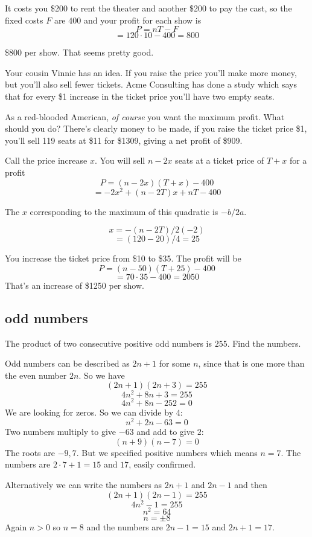\documentclass[11pt, oneside]{article}
\begin{document}
It costs you \$200 to rent the theater and another \$200 to pay the cast, so the fixed costs $F$ are $400$ and your profit for each show is
\[ P = nT - F \]
\[ = 120 \cdot 10 - 400 = 800 \]

\$800 per show.  That seems pretty good.

Your cousin Vinnie has an idea.  If you raise the price you'll make more money, but you'll also sell fewer tickets.  Acme Consulting has done a study which says that for every \$1 increase in the ticket price you'll have two empty seats.

As a red-blooded American, \emph{of course} you want the maximum profit.  What should you do?  There's clearly money to be made, if you raise the ticket price \$1, you'll sell 119 seats at \$11 for \$1309, giving a net profit of \$909.

Call the price increase $x$.  You will sell $n - 2x$ seats at a ticket price of $T + x$ for a profit
\[ P = (n - 2x)(T + x) - 400 \]
\[ = -2x^2 + (n - 2T)x + nT - 400 \]

The $x$ corresponding to the maximum of this quadratic is $-b/2a$.

\[ x  = -(n - 2T)/2(-2) \]
\[   = (120 - 20)/4 = 25 \]

You increase the ticket price from \$10 to \$35.  The profit will be
\[ P = (n - 50)(T + 25) - 400 \]
\[ = 70 \cdot 35 - 400 = 2050 \]
That's an increase of \$1250 per show.

\subsection*{odd numbers}
The product of two consecutive positive odd numbers is $255$.  Find the numbers.

Odd numbers can be described as $2n+1$ for some $n$, since that is one more than the even number $2n$.  So we have
\[ (2n + 1)(2n + 3) = 255 \]
\[ 4n^2 + 8n + 3 = 255 \]
\[ 4n^2 + 8n - 252 = 0 \]
We are looking for zeros.  So we can divide by $4$:
\[ n^2 + 2n - 63 = 0 \]
Two numbers multiply to give $-63$ and add to give $2$:
\[ (n + 9)(n - 7) = 0 \]
The roots are $-9, 7$.  But we specified positive numbers which means $n = 7$.  The numbers are $2 \cdot 7 + 1 = 15$ and $17$, easily confirmed.

Alternatively we can write the numbers as $2n + 1$ and $2n - 1$ and then
\[ (2n + 1)(2n - 1) = 255 \]
\[ 4n^2 - 1 = 255 \]
\[ n^2 = 64 \]
\[ n = \pm 8 \]
Again $n > 0$ so $n = 8$ and the numbers are $2n - 1 = 15$ and $2n + 1 = 17$.
\end{document}
